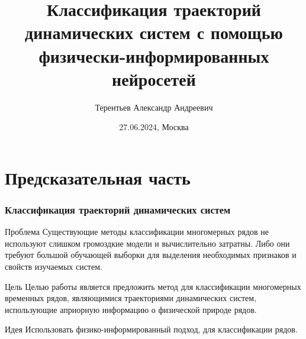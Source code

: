 \documentclass{beamer}
\title[Классификационные ФИНН] %
{Классификация траекторий динамических систем с помощью физически-информированных нейросетей}
\author[Терентьев Александр] %
{Терентьев Александр Андреевич}
\institute[MIPT] %
{
  
  Московский физико-технический институт, 
  
  Физтех-школа прикладной математики и информатики\\

  Кафедра интеллектуальных систем

  Научный руководитель: к.ф.-м.н. Исаченко Р.В.
}
\date[27.06.2024] %
{27.06.2024, Москва}
\begin{document}
\frame{\titlepage}




\section{}

\section{Предсказательная часть}

\begin{frame}
\frametitle{Классификация траекторий динамических систем}
\begin{block}{Проблема}
Существующие методы классификации многомерных рядов не используют слишком громоздкие модели и вычислительно затратны. Либо они требуют большой обучающей выборки для выделения необходимых признаков и свойств изучаемых систем. 
\end{block}
\begin{block}{Цель}
Целью работы является предложить метод для классификации многомерных временных рядов, являющимися траекториями динамических систем,  использующие априорную информацию о физической природе рядов.
\end{block}

\begin{block}{Идея}
Использовать физико-информированный подход, для классификации рядов.
\end{block}


\end{frame}
\end{document}

